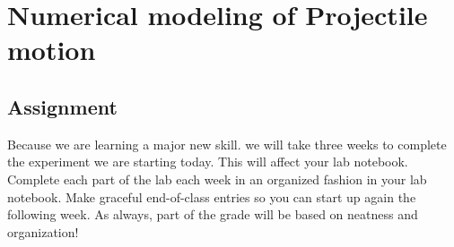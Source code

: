 \documentclass[twoside,11pt,ShortChapTitles]{BYUTextbook}
\begin{document}
\chapter[Numerical modeling I]{Numerical modeling of Projectile motion}


\section{Assignment}

{\small Because we are learning a major new skill. we will take three weeks to
complete the experiment we are starting today. This will affect your lab
notebook. Complete each part of the lab each week in an organized fashion in
your lab notebook. Make graceful end-of-class entries so you can start up
again the following week. As always, part of the grade will be based on
neatness and organization!}
\end{document}
